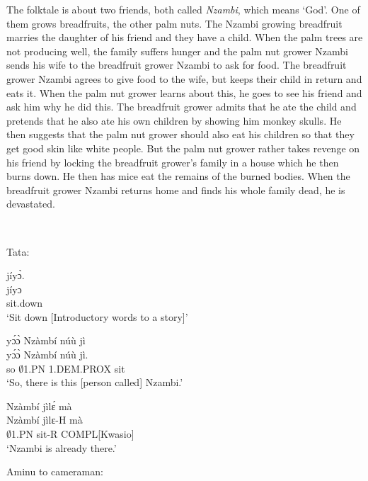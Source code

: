 The folktale is about two friends, both called {\itshape Nzambi}, which means `God'. One of them grows breadfruits, the other palm nuts. The Nzambi growing breadfruit marries the daughter of his friend and they have a child. When the palm trees are not producing well, the family suffers hunger and the palm nut grower Nzambi sends his wife to the breadfruit grower Nzambi to ask for food. The breadfruit grower Nzambi agrees to give food to the wife, but keeps their child in return and eats it. When the palm nut grower learns about this, he goes to see his friend and ask him why he did this. The breadfruit grower admits that he ate the child and pretends that he also ate his own children by showing him monkey skulls. He then suggests that the palm nut grower should also eat his children so that they get good skin like white people. But the palm nut grower rather takes revenge on his friend by locking the breadfruit grower's family in a house which he then burns down. He then has mice eat the remains of the burned bodies. When the breadfruit grower Nzambi returns home and finds his whole family dead, he is devastated.

\

\noindent Tata:

\begin{exe} 
\exN\label{01}
  \glll    jíyɔ̀. \\
           jíyɔ \\
             sit.down \\
    \trans `Sit down [Introductory words to a story]'
\end{exe}

\begin{exe} 
\exN\label{02}
  \glll     yɔ́ɔ̀ Nzàmbí núù jì  \\
           yɔ́ɔ̀ Nzàmbí núù jì. \\
              so $\emptyset$1.PN 1.DEM.PROX sit   \\
    \trans `So, there is this [person called] Nzambi.'
\end{exe}

\begin{exe} 
\exN\label{03}
  \glll   Nzàmbí jìlɛ́ mà \\
         Nzàmbí jìlɛ-H mà \\
            $\emptyset$1.PN sit-R COMPL[Kwasio]     \\
    \trans `Nzambi is already there.'
\end{exe}

\noindent Aminu to cameraman:

